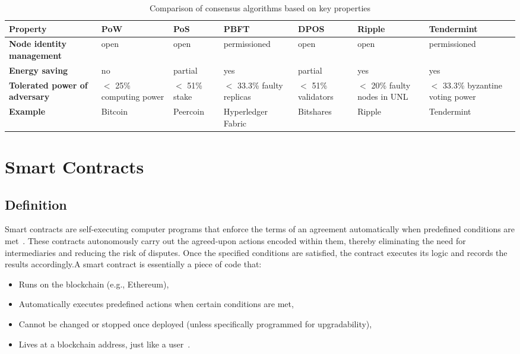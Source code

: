 \begin{table}[H]
\centering
\small
\renewcommand{\arraystretch}{1.4} %
\begin{tabular}{|p{4.3cm}|p{1.8cm}|p{1.8cm}|p{1.8cm}|p{1.8cm}|p{1.8cm}|p{2cm}|}
\hline
\textbf{Property} & \textbf{PoW} & \textbf{PoS} & \textbf{PBFT} & \textbf{DPOS} & \textbf{Ripple} & \textbf{Tendermint} \\
\hline
\textbf{Node identity management} & open & open & permissioned & open & open & permissioned \\
\hline
\textbf{Energy saving} & no & partial & yes & partial & yes & yes \\
\hline
\textbf{Tolerated power of adversary} & $<$ 25\% computing power & $<$ 51\% stake & $<$ 33.3\% faulty replicas & $<$ 51\% validators & $<$ 20\% faulty nodes in UNL & $<$ 33.3\% byzantine voting power \\
\hline
\textbf{Example} & Bitcoin~\cite{nakamoto2008bitcoin} & Peercoin~\cite{king2013primecoin} & Hyperledger Fabric~\cite{hyperledger2015} & Bitshares~\cite{bitshares2016} & Ripple~\cite{schwartz2014ripple} & Tendermint~\cite{kwon2014tendermint} \\
\hline
\end{tabular}
\caption{\centering Comparison of consensus algorithms based on key properties}
\label{tab:consensus_comparison}
\end{table}

\chapter{Smart Contracts}
\section{Definition}
Smart contracts are self-executing computer programs that enforce the terms of an agreement automatically when predefined conditions are met~\cite{buterin2014whitepaper}. These contracts autonomously carry out the agreed-upon actions encoded within them, thereby eliminating the need for intermediaries and reducing the risk of disputes. Once the specified conditions are satisfied, the contract executes its logic and records the results accordingly.A smart contract is essentially a piece of code that:
\begin{itemize}
  \item Runs on the blockchain (e.g., Ethereum),
  \item Automatically executes predefined actions when certain conditions are met,
  \item Cannot be changed or stopped once deployed (unless specifically programmed for upgradability),
  \item Lives at a blockchain address, just like a user~\cite{buterin2014whitepaper}.
\end{itemize}


